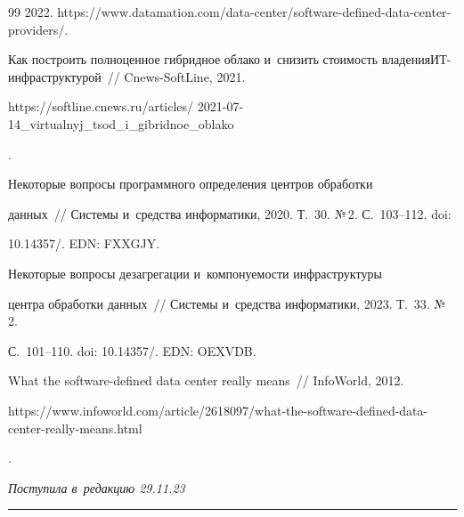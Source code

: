 {{\begin{thebibliography}{99}
2022. {\sf https://www.datamation.com/data-center/software-defined-data-center-providers/}. 




Как построить полноценное гибридное облако и~снизить стоимость владения\linebreak ИТ-инф\-ра\-струк\-ту\-рой~/\!\!/ Cnews-SoftLine, 2021. {\sf  


https://softline.cnews.ru/articles/ 2021-07-14\_virtualnyj\_tsod\_i\_gibridnoe\_oblako}. 




 Некоторые вопросы программного определения центров обработки 


данных~/\!\!/ Системы и~средства информатики, 2020. Т.~30. №\,2. С.~103--112. doi: 


10.14357\!/. EDN: FXXGJY.




 Некоторые вопросы дезагрегации и~компонуемости инфраструктуры 


центра обработки данных~/\!\!/ Системы и~средства информатики, 2023. Т.~33. №\,2. 


С.~101--110. doi: 10.14357\!/. EDN: OEXVDB.




 What the software-defined data center really means~/\!\!/ InfoWorld, 2012. {\sf 


https://www.infoworld.com/article/2618097/what-the-software-defined-data-center-really-means.html}. 


     \end{thebibliography}


} }











\vspace*{-6pt}





\hfill{\small\textit{Поступила в~редакцию 29.11.23}}





\vspace*{8pt}





\hrule





